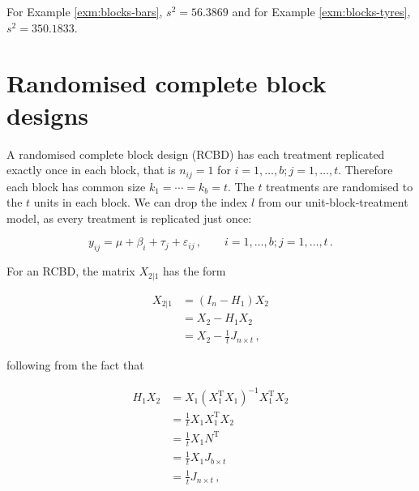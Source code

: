 \documentclass[
]{book}
\newenvironment{Shaded}{\begin{snugshade}}{\end{snugshade}}
\newcommand{\DecValTok}[1]{\textcolor[rgb]{0.00,0.00,0.81}{#1}}
\newcommand{\FunctionTok}[1]{\textcolor[rgb]{0.00,0.00,0.00}{#1}}
\newcommand{\NormalTok}[1]{#1}
\newcommand{\OtherTok}[1]{\textcolor[rgb]{0.56,0.35,0.01}{#1}}
\newcommand{\SpecialCharTok}[1]{\textcolor[rgb]{0.00,0.00,0.00}{#1}}
\theoremstyle{definition}
\theoremstyle{definition}
\theoremstyle{definition}
\theoremstyle{definition}
\theoremstyle{remark}
\begin{document}
\begin{Shaded}
\end{Shaded}

For Example \ref{exm:blocks-bars},
\(s^2 = 56.3869\) and for Example \ref{exm:blocks-tyres}, \(s^2 = 350.1833\).

\hypertarget{rcdb}{%
\section{Randomised complete block designs}\label{rcdb}}

A randomised complete block design (RCBD) has each treatment replicated exactly once in each block, that is \(n_{ij} = 1\) for \(i=1,\ldots, b; j = 1, \ldots, t\). Therefore each block has common size \(k_1=\cdots =k_b = t\). The \(t\) treatments are randomised to the \(t\) units in each block. We can drop the index \(l\) from our unit-block-treatment model, as every treatment is replicated just once:

\begin{equation*}
y_{ij} = \mu + \beta_i + \tau_j + \varepsilon_{ij}\,, \qquad i = 1,\ldots, b; j = 1, \ldots, t\,.
\end{equation*}

For an RCBD, the matrix \(X_{2|1}\) has the form

\begin{align}
X_{2|1} & = (I_n - H_1)X_2 \nonumber \\
& = X_2 - H_1X_2 \nonumber \\
& = X_2 - \frac{1}{t}J_{n \times t} \label{eq:rcbd-x21}\,,
\end{align}

following from the fact that

\begin{align}
H_1X_2 & = X_1(X_1^{\mathrm{T}}X_1)^{-1}X_1^{\mathrm{T}}X_2 \\
& = \frac{1}{t}X_1X_1^{\mathrm{T}}X_2 \\
& = \frac{1}{t}X_1N^{\mathrm{T}} \\
& = \frac{1}{t}X_1J_{b\times t} \\
& = \frac{1}{t}J_{n\times t}\,,
\end{align}
\end{document}
